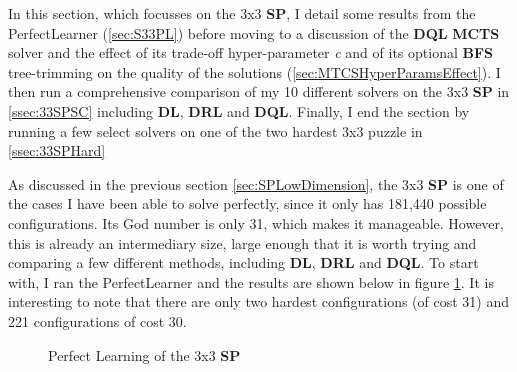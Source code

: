 \label{sec:S33}

In this section, which focusses on the 3x3 \textbf{SP}, I detail some results from the PerfectLearner (\ref{sec:S33PL}) before moving to a discussion of the \textbf{DQL} \textbf{MCTS} solver and the effect of its trade-off hyper-parameter \textit{c} and of its optional \textbf{BFS} tree-trimming on the quality of the solutions (\ref{sec:MTCSHyperParamsEffect}). I then run a comprehensive comparison of my 10 different solvers on the 3x3 \textbf{SP} in \ref{ssec:33SPSC} including \textbf{DL},  \textbf{DRL} and  \textbf{DQL}. Finally, I end the section by running a few select solvers on one of the two hardest 3x3 puzzle in \ref{ssec:33SPHard}


\label{sec:S33PL}
As discussed in the previous section \ref{sec:SPLowDimension}, the 3x3 \textbf{SP} is one of the cases I have been able to solve perfectly, since it only has 181,440 possible configurations. Its God number is only 31, which makes it manageable. However, this is already an intermediary size, large enough that it is worth trying and comparing a few different methods, including \textbf{DL}, \textbf{DRL} and \textbf{DQL}. To start with, I ran the PerfectLearner and the results are shown below in figure \ref{fig:33SPPerfectLearning}. It is interesting to note that there are only two hardest configurations (of cost 31) and 221 configurations of cost 30.


\begin{figure}[H]
  \noindent
  \caption[33SPPerfectLearning]{Perfect Learning of the 3x3 \textbf{SP}}
  \label{fig:33SPPerfectLearning}
\end{figure}




